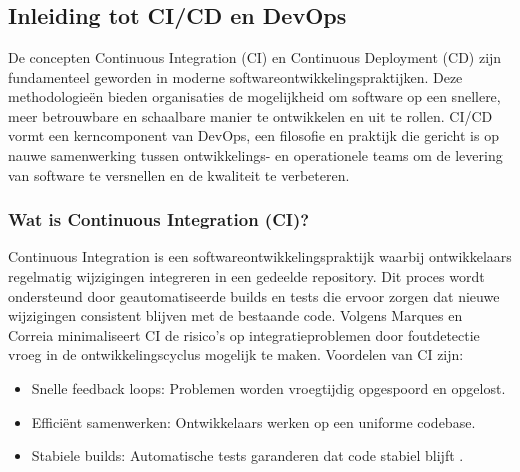 \chapter{}%
\label{ch:stand-van-zaken}


\section{Inleiding tot CI/CD en DevOps}

De concepten Continuous Integration (CI) en Continuous Deployment (CD) zijn fundamenteel geworden in moderne softwareontwikkelingspraktijken. Deze methodologieën bieden organisaties de mogelijkheid om software op een snellere, meer betrouwbare en schaalbare manier te ontwikkelen en uit te rollen. CI/CD vormt een kerncomponent van DevOps, een filosofie en praktijk die gericht is op nauwe samenwerking tussen ontwikkelings- en operationele teams om de levering van software te versnellen en de kwaliteit te verbeteren.

\subsection{Wat is Continuous Integration (CI)?}
Continuous Integration is een softwareontwikkelingspraktijk waarbij ontwikkelaars regelmatig wijzigingen integreren in een gedeelde repository. Dit proces wordt ondersteund door geautomatiseerde builds en tests die ervoor zorgen dat nieuwe wijzigingen consistent blijven met de bestaande code. Volgens Marques en Correia \autocite{marques2023} minimaliseert CI de risico's op integratieproblemen door foutdetectie vroeg in de ontwikkelingscyclus mogelijk te maken. Voordelen van CI zijn:
\begin{itemize}
    \item Snelle feedback loops: Problemen worden vroegtijdig opgespoord en opgelost.
    \item Efficiënt samenwerken: Ontwikkelaars werken op een uniforme codebase.
    \item Stabiele builds: Automatische tests garanderen dat code stabiel blijft .
\end{itemize}

